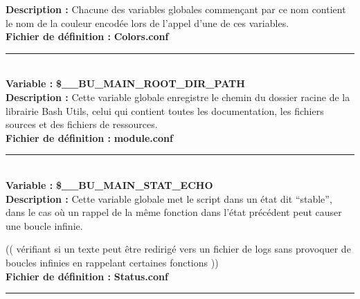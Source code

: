 \documentclass[a4paper,10pt]{article}
\begin{document}
\textbf{Description :} Chacune des variables globales commençant par ce nom contient le nom de la couleur encodée lors de l'appel d'une de ces variables.\\[1\baselineskip]

\textbf{Fichier de définition :} \textbf{\color{lime}Colors.conf\color{white}}\\[1\baselineskip]



\par\noindent\rule{\textwidth}{0.4pt}\\[1\baselineskip]

\textbf{Variable :} \textbf{\color{orange}\$\_\_BU\_MAIN\_ROOT\_DIR\_PATH\color{white}}\\[1\baselineskip]

\textbf{Description :} Cette variable globale enregistre le chemin du dossier racine de la librairie Bash Utils, celui qui contient toutes les documentation, les fichiers sources et des fichiers de ressources.\\[1\baselineskip]

\textbf{Fichier de définition :} \textbf{\color{lime}module.conf\color{white}}\\[1\baselineskip]



\par\noindent\rule{\textwidth}{0.4pt}\\[1\baselineskip]

\textbf{Variable :} \textbf{\color{orange}\$\_\_BU\_MAIN\_STAT\_ECHO\color{white}}\\[1\baselineskip]

\textbf{Description :} Cette variable globale met le script dans un état dit ``stable'', dans le cas où un rappel de la même fonction dans l'état précédent peut causer une boucle infinie.


(( vérifiant si un texte peut être redirigé vers un fichier de logs sans provoquer de boucles infinies en\linebreak
rappelant certaines fonctions ))
\\[1\baselineskip]

\textbf{Fichier de définition :} \textbf{\color{lime}Status.conf\color{white}}\\[1\baselineskip]



\par\noindent\rule{\textwidth}{0.4pt}\\[1\baselineskip]
\end{document}
